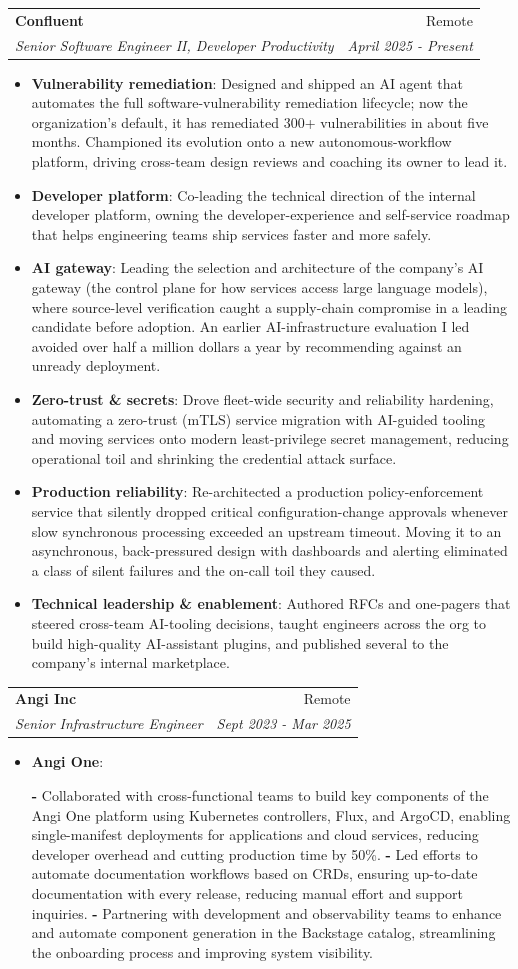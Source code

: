 \documentclass[letterpaper,11pt]{article}
\makeatletter
\newcommand{\resumeItem}[2]{
\item\small{
\textbf{#1}{: #2 \vspace{-2pt}}
}
}
\newcommand{\resumeSubheading}[4]{
\vspace{-1pt}\item
\begin{tabular*}{0.97\textwidth}[t]{l@{\extracolsep{\fill}}r}
    \textbf{#1}       & #2                 \\
    \textit{\small#3} & \textit{\small #4} \\
\end{tabular*}\vspace{-3pt}
}
\newcommand{\resumeItemListStart}{\begin{itemize}}
\newcommand{\resumeItemListEnd}{\end{itemize}\vspace{-5pt}}
\makeatother
\begin{document}
\resumeSubheading
{Confluent}{Remote}
{Senior Software Engineer II, Developer Productivity}{April 2025 - Present}
\resumeItemListStart
\resumeItem{Vulnerability remediation}
{Designed and shipped an AI agent that automates the full software-vulnerability remediation lifecycle; now the organization's default, it has remediated 300+ vulnerabilities in about five months. Championed its evolution onto a new autonomous-workflow platform, driving cross-team design reviews and coaching its owner to lead it.}
\resumeItem{Developer platform}
{Co-leading the technical direction of the internal developer platform, owning the developer-experience and self-service roadmap that helps engineering teams ship services faster and more safely.}
\resumeItem{AI gateway}
{Leading the selection and architecture of the company's AI gateway (the control plane for how services access large language models), where source-level verification caught a supply-chain compromise in a leading candidate before adoption. An earlier AI-infrastructure evaluation I led avoided over half a million dollars a year by recommending against an unready deployment.}
\resumeItem{Zero-trust \& secrets}
{Drove fleet-wide security and reliability hardening, automating a zero-trust (mTLS) service migration with AI-guided tooling and moving services onto modern least-privilege secret management, reducing operational toil and shrinking the credential attack surface.}
\resumeItem{Production reliability}
{Re-architected a production policy-enforcement service that silently dropped critical configuration-change approvals whenever slow synchronous processing exceeded an upstream timeout. Moving it to an asynchronous, back-pressured design with dashboards and alerting eliminated a class of silent failures and the on-call toil they caused.}
\resumeItem{Technical leadership \& enablement}
{Authored RFCs and one-pagers that steered cross-team AI-tooling decisions, taught engineers across the org to build high-quality AI-assistant plugins, and published several to the company's internal marketplace.}
\resumeItemListEnd

\resumeSubheading
{Angi Inc}{Remote}
{Senior Infrastructure Engineer}{Sept 2023 - Mar 2025}
\resumeItemListStart
\resumeItem{Angi One}{}
\newline
{\textbf{-} Collaborated with cross-functional teams to build key components of the Angi One platform using Kubernetes controllers, Flux, and ArgoCD, enabling single-manifest deployments for applications and cloud services, reducing developer overhead and cutting production time by 50\%.}
\newline
{\textbf{-} Led efforts to automate documentation workflows based on CRDs, ensuring up-to-date documentation with every release, reducing manual effort and support inquiries.}
\newline
{\textbf{-} Partnering with development and observability teams to enhance and automate component generation in the Backstage catalog, streamlining the onboarding process and improving system visibility.}
\resumeItemListEnd
\end{document}
